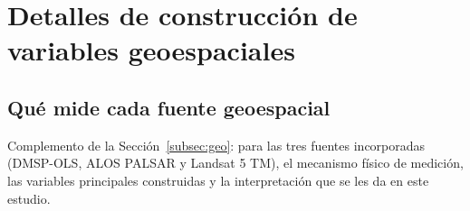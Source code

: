 \documentclass[12pt, letterpaper]{article}
\begin{document}
{\footnotesize

}

\section{Detalles de construcción de variables geoespaciales}
\label{apx:geo}


\subsection{Qué mide cada fuente geoespacial}
\label{apx:variables_geo}

Complemento de la Sección~\ref{subsec:geo}: para las tres fuentes
incorporadas (DMSP-OLS, ALOS PALSAR y Landsat 5 TM), el mecanismo físico
de medición, las variables principales construidas y la interpretación
que se les da en este estudio.
\end{document}
